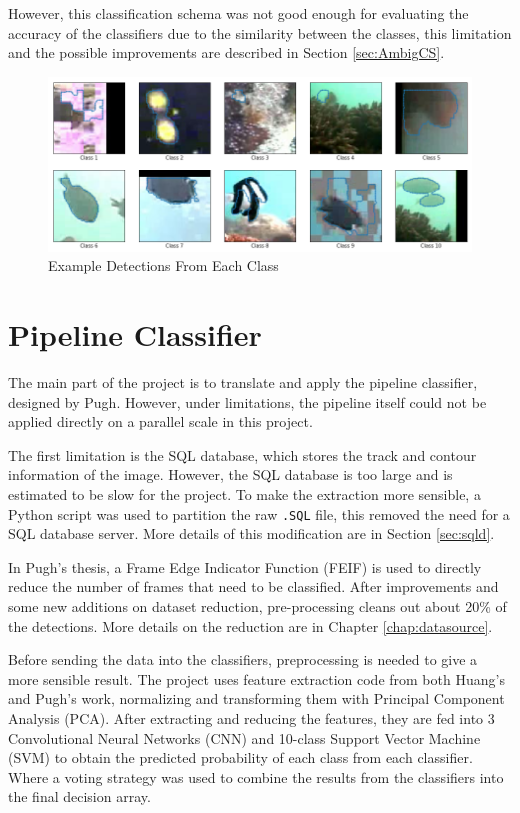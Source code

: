 \documentclass[bsc,frontabs,twoside,fullspacing,parskip,deptreport]{infthesis}
\begin{document}
However, this classification schema was not good enough for evaluating the accuracy of the classifiers due to the similarity between the classes, this limitation and the possible improvements are described in Section \ref{sec:AmbigCS}.

\begin{figure}
    \centering
    \includegraphics[scale=0.4]{graph/class_sample.png}
    \caption{Example Detections From Each Class}
    \label{fig:classes}
\end{figure}

\section{Pipeline Classifier}

The main part of the project is to translate and apply the pipeline classifier, designed by Pugh\cite{Pugh}. 
However, under limitations, the pipeline itself could not be applied directly on a parallel scale in this project.

The first limitation is the SQL database, which stores the track and contour information of the image. 
However, the SQL database is too large and is estimated to be slow for the project.
To make the extraction more sensible, a Python script was used to partition the raw {\tt .SQL} file, this removed the need for a SQL database server. 
More details of this modification are in Section \ref{sec:sqld}.

In Pugh's thesis\cite{Pugh}, a Frame Edge Indicator Function (FEIF) is used to directly reduce the number of frames that need to be classified. 
After improvements and some new additions on dataset reduction, pre-processing cleans out about 20\% of the detections. More details on the reduction are in Chapter \ref{chap:datasource}.

Before sending the data into the classifiers, preprocessing is needed to give a more sensible result.
The project uses feature extraction code from both Huang's\cite{Huang} and Pugh's\cite{Pugh} work, normalizing and transforming them with Principal Component Analysis (PCA).
After extracting and reducing the features, they are fed into 3 Convolutional Neural Networks (CNN) and 10-class Support Vector Machine (SVM) to obtain the predicted probability of each class from each classifier.
Where a voting strategy was used to combine the results from the classifiers into the final decision array.
\end{document}

